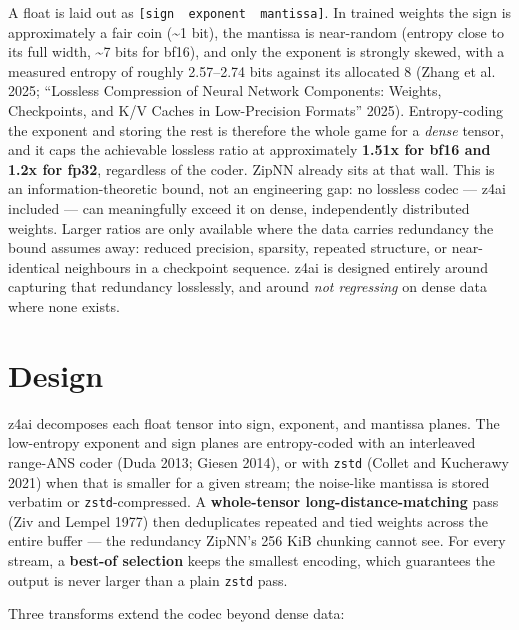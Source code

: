 \documentclass[
]{article}
\begin{document}
A float is laid out as
\texttt{{[}sign\ \textbar{}\ exponent\ \textbar{}\ mantissa{]}}. In
trained weights the sign is approximately a fair coin (\textasciitilde1
bit), the mantissa is near-random (entropy close to its full width,
\textasciitilde7 bits for bf16), and only the exponent is strongly
skewed, with a measured entropy of roughly 2.57--2.74 bits against its
allocated 8 (Zhang et al. 2025; {``Lossless Compression of Neural
Network Components: Weights, Checkpoints, and {K/V} Caches in
Low-Precision Formats''} 2025). Entropy-coding the exponent and storing
the rest is therefore the whole game for a \emph{dense} tensor, and it
caps the achievable lossless ratio at approximately \textbf{1.51x for
bf16 and 1.2x for fp32}, regardless of the coder. ZipNN already sits at
that wall. This is an information-theoretic bound, not an engineering
gap: no lossless codec --- z4ai included --- can meaningfully exceed it
on dense, independently distributed weights. Larger ratios are only
available where the data carries redundancy the bound assumes away:
reduced precision, sparsity, repeated structure, or near-identical
neighbours in a checkpoint sequence. z4ai is designed entirely around
capturing that redundancy losslessly, and around \emph{not regressing}
on dense data where none exists.

\section{Design}\label{design}

z4ai decomposes each float tensor into sign, exponent, and mantissa
planes. The low-entropy exponent and sign planes are entropy-coded with
an interleaved range-ANS coder (Duda 2013; Giesen 2014), or with
\texttt{zstd} (Collet and Kucherawy 2021) when that is smaller for a
given stream; the noise-like mantissa is stored verbatim or
\texttt{zstd}-compressed. A \textbf{whole-tensor long-distance-matching}
pass (Ziv and Lempel 1977) then deduplicates repeated and tied weights
across the entire buffer --- the redundancy ZipNN's 256 KiB chunking
cannot see. For every stream, a \textbf{best-of selection} keeps the
smallest encoding, which guarantees the output is never larger than a
plain \texttt{zstd} pass.

Three transforms extend the codec beyond dense data:
\end{document}
